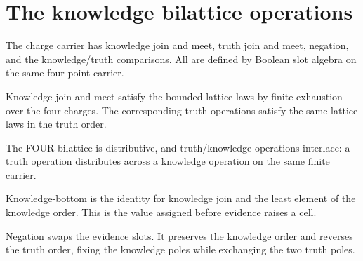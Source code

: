 \section{The knowledge bilattice operations}

\begin{proposition}\label{thm:four-bilattice}\leanok{}
The charge carrier has knowledge join and meet, truth join and meet, negation,
and the knowledge/truth comparisons. All are defined by Boolean slot algebra
on the same four-point carrier.
\end{proposition}

\begin{theorem}\label{thm:joinK-lattice}\leanok{}
Knowledge join and meet satisfy the bounded-lattice laws by finite exhaustion
over the four charges. The corresponding truth operations satisfy the same
lattice laws in the truth order.
\end{theorem}

\begin{theorem}\label{thm:bilattice-distrib}\leanok{}
The FOUR bilattice is distributive, and truth/knowledge operations interlace:
a truth operation distributes across a knowledge operation on the same finite
carrier.
\end{theorem}

\begin{theorem}\label{thm:kBot-least}\leanok{}
Knowledge-bottom is the identity for knowledge join and the least element of
the knowledge order. This is the value assigned before evidence raises a cell.
\end{theorem}

\begin{theorem}\label{thm:negate-duality}\leanok{}
Negation swaps the evidence slots. It preserves the knowledge order and
reverses the truth order, fixing the knowledge poles while exchanging the two
truth poles.
\end{theorem}
